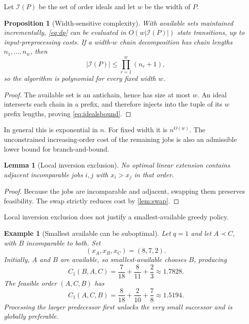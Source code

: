 \documentclass[pdflatex,iicol,sn-basic]{sn-jnl}
\theoremstyle{thmstyleone}
\newtheorem{proposition}[theorem]{Proposition}
\newtheorem{lemma}[theorem]{Lemma}
\theoremstyle{thmstyletwo}
\newtheorem{example}[theorem]{Example}
\theoremstyle{thmstylethree}
\newcommand{\cI}{\mathcal{I}}
\begin{document}
Let \(\cI(P)\) be the set of order ideals and let \(w\) be the width of \(P\).

\begin{proposition}[Width-sensitive complexity]
\label{prop:width}
With available sets maintained incrementally, \eqref{eq:dp} can be evaluated in
\(O(w|\cI(P)|)\) state transitions, up to input-preprocessing costs. If a
width-\(w\) chain decomposition has chain lengths \(n_1,\ldots,n_w\), then
\begin{equation}\label{eq:idealsbound}
|\cI(P)|\le\prod_{r=1}^w(n_r+1),
\end{equation}
so the algorithm is polynomial for every fixed width \(w\).
\end{proposition}

\begin{proof}
The available set is an antichain, hence has size at most \(w\). An ideal
intersects each chain in a prefix, and therefore injects into the tuple of its
\(w\) prefix lengths, proving \eqref{eq:idealsbound}.
\end{proof}

In general this is exponential in \(n\). For fixed width it is \(n^{O(w)}\). The
unconstrained increasing-order cost of the remaining jobs is also an admissible
lower bound for branch-and-bound.

\begin{lemma}[Local inversion exclusion]
\label{lem:local}
No optimal linear extension contains adjacent incomparable jobs \(i,j\) with
\(x_i>x_j\) in that order.
\end{lemma}

\begin{proof}
Because the jobs are incomparable and adjacent, swapping them preserves
feasibility. The swap strictly reduces cost by \cref{lem:swap}.
\end{proof}

Local inversion exclusion does not justify a smallest-available greedy policy.

\begin{example}[Smallest available can be suboptimal]
\label{ex:greedy}
Let \(q=1\) and let \(A\prec C\), with \(B\) incomparable to both. Set
\[
(x_A,x_B,x_C)=(8,7,2).
\]
Initially, \(A\) and \(B\) are available, so smallest-available chooses \(B\),
producing
\[
C_1(B,A,C)=\frac7{18}+\frac8{11}+\frac23\approx1.7828.
\]
The feasible order \((A,C,B)\) has
\[
C_1(A,C,B)=\frac8{18}+\frac2{10}+\frac78\approx1.5194.
\]
Processing the larger predecessor first unlocks the very small successor and is
globally preferable.
\end{example}
\end{document}
